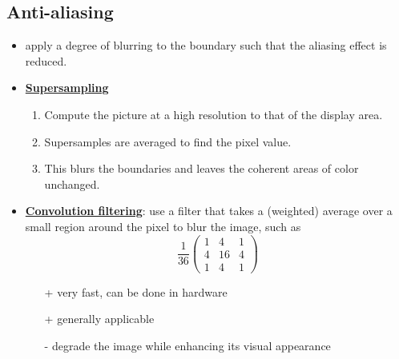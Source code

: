 \documentclass[twocolumn,landscape,10pt]{article}
\theoremstyle{definition}
\begin{document}
\subsection{Anti-aliasing}

\begin{itemize}
    \item apply a degree of blurring to the boundary such that the
        aliasing effect is reduced.
    \item \underline{\textbf{Supersampling}}
        \begin{enumerate}
            \item Compute the picture at a high resolution to that of the
                display area.
            \item Supersamples are averaged to find the pixel value.
            \item This blurs the boundaries and leaves the coherent areas of
                color unchanged.
        \end{enumerate} 
    \item \underline{\textbf{Convolution filtering}}: use a filter that takes a
        (weighted) average over a small region around the pixel to blur the
        image, such as
        \[
            \frac{1}{36}
            \begin{pmatrix}
                1 & 4 & 1 \\
                4 & 16 & 4 \\
                1 & 4 & 1
            \end{pmatrix} 
        \]
        \begin{itemize}
            \item[+] very fast, can be done in hardware
            \item[+] generally applicable
            \item[-] degrade the image while enhancing its visual appearance
        \end{itemize} 
\end{itemize} 
\end{document}
